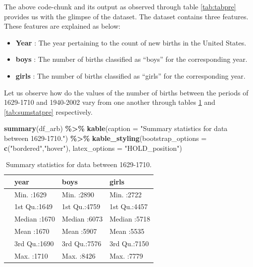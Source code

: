 \documentclass[11pt,a4paper,]{article}
\newenvironment{Shaded}{\begin{snugshade}}{\end{snugshade}}
\newcommand{\AttributeTok}[1]{\textcolor[rgb]{0.13,0.29,0.53}{#1}}
\newcommand{\FunctionTok}[1]{\textcolor[rgb]{0.13,0.29,0.53}{\textbf{#1}}}
\newcommand{\NormalTok}[1]{#1}
\newcommand{\SpecialCharTok}[1]{\textcolor[rgb]{0.81,0.36,0.00}{\textbf{#1}}}
\newcommand{\StringTok}[1]{\textcolor[rgb]{0.31,0.60,0.02}{#1}}
\providecommand{\tightlist}{%
  \setlength{\itemsep}{0pt}\setlength{\parskip}{0pt}}
\begin{document}
The above code-chunk and its output as observed through table \ref{tab:tabpre} provides us with the glimpse of the dataset. The dataset contains three features. These features are explained as below:

\begin{itemize}
\tightlist
\item
  \textbf{Year} : The year pertaining to the count of new births in the United States.
\item
  \textbf{boys} : The number of births classified as ``boys'' for the corresponding year.
\item
  \textbf{girls} : The number of births classified as ``girls'' for the corresponding year.
\end{itemize}

Let us observe how do the values of the number of births between the periods of 1629-1710 and 1940-2002 vary from one another through tables \ref{tab:sumstatarb} and \ref{tab:sumstatpre} respectively.

\tiny

\begin{Shaded}
\begin{Highlighting}[]
\FunctionTok{summary}\NormalTok{(df\_arb) }\SpecialCharTok{\%\textgreater{}\%} \FunctionTok{kable}\NormalTok{(}\AttributeTok{caption =} \StringTok{"Summary statistics for data between 1629{-}1710."}\NormalTok{) }\SpecialCharTok{\%\textgreater{}\%} 
  \FunctionTok{kable\_styling}\NormalTok{(}\AttributeTok{bootstrap\_options =} \FunctionTok{c}\NormalTok{(}\StringTok{"bordered"}\NormalTok{,}\StringTok{"hover"}\NormalTok{),}
                                    \AttributeTok{latex\_options =} \StringTok{"HOLD\_position"}\NormalTok{) }
\end{Highlighting}
\end{Shaded}

\begin{table}[H]

\caption{\label{tab:sumstatarb}Summary statistics for data between 1629-1710.}
\centering
\begin{tabular}[t]{l|l|l|l}
\hline
  &      year &      boys &     girls\\
\hline
 & Min.   :1629 & Min.   :2890 & Min.   :2722\\
\hline
 & 1st Qu.:1649 & 1st Qu.:4759 & 1st Qu.:4457\\
\hline
 & Median :1670 & Median :6073 & Median :5718\\
\hline
 & Mean   :1670 & Mean   :5907 & Mean   :5535\\
\hline
 & 3rd Qu.:1690 & 3rd Qu.:7576 & 3rd Qu.:7150\\
\hline
 & Max.   :1710 & Max.   :8426 & Max.   :7779\\
\hline
\end{tabular}
\end{table}
\end{document}

